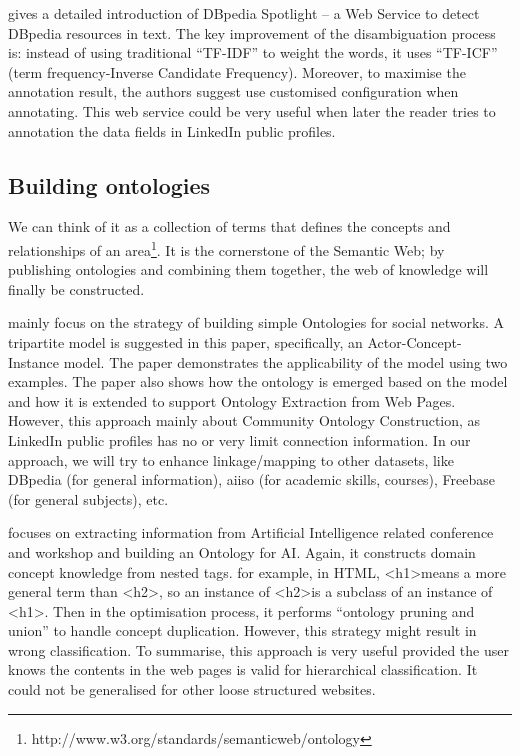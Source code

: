 \cite{mendes2011} gives a detailed introduction of DBpedia Spotlight -- a Web Service to detect DBpedia resources in text. The key improvement of the disambiguation process is: instead of using traditional ``TF-IDF'' to weight the words, it uses ``TF-ICF'' (term frequency-Inverse Candidate Frequency). Moreover, to maximise the annotation result, the authors suggest use customised configuration when annotating. This web service could be very useful when later the reader tries to annotation the data fields in LinkedIn public profiles.

\subsection{Building ontologies}

We can think of it as a collection of terms that  defines the concepts and relationships of an area\footnote{http://www.w3.org/standards/semanticweb/ontology}. It is the cornerstone of the Semantic Web; by publishing ontologies and combining them together, the web of knowledge will finally be constructed. 


\cite{mika2007} mainly focus on the strategy of building simple Ontologies for social networks. A tripartite model is suggested in this paper, specifically, an Actor-Concept-Instance model. The paper demonstrates the applicability of the model using two examples. The paper also shows how the ontology is emerged based on the model and how it is extended to support Ontology Extraction from Web Pages. However, this approach mainly about Community Ontology Construction, as LinkedIn public profiles has no or very limit connection information. In our approach, we will try to enhance linkage/mapping to other datasets, like DBpedia (for general information), \gls{aiiso} (for academic skills, courses), Freebase (for general subjects), etc.

\cite{wang2011} focuses on extracting information from Artificial Intelligence related conference and workshop and building an Ontology for AI. Again, it constructs domain concept knowledge from nested tags. for example, in HTML, \textless h1\textgreater means a more general term than \textless h2\textgreater, so an instance of \textless h2\textgreater is a subclass of an instance of \textless h1\textgreater. Then in the optimisation process, it performs ``ontology pruning and union'' to handle concept duplication. However, this strategy might result in wrong classification. To summarise, this approach is very useful provided the user knows the contents in the web pages is valid for hierarchical classification. It could not be generalised for other loose structured websites.

